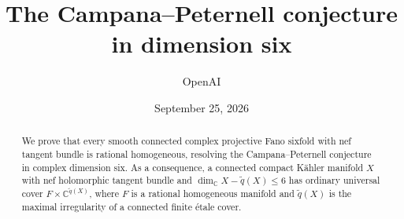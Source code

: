 \documentclass[11pt]{article}
\title{The Campana--Peternell conjecture\protect\\ in dimension six}
\author{OpenAI}
\date{September 25, 2026}
\theoremstyle{definition}
\theoremstyle{remark}
\numberwithin{equation}{section}
\begin{document}
\maketitle
\begin{abstract}
We prove that every smooth connected complex projective Fano sixfold with nef
tangent bundle is rational homogeneous, resolving the Campana--Peternell
conjecture in complex dimension six.
As a consequence, a connected compact K\"ahler manifold $X$ with nef
holomorphic tangent bundle and
$\dim_{\mathbb C}X-\widetilde q(X)\leq6$ has ordinary universal cover
$F\times\mathbb C^{\widetilde q(X)}$, where $F$ is a rational homogeneous
manifold and $\widetilde q(X)$ is the maximal irregularity of a connected
finite \'{e}tale cover.
\end{abstract}
\tableofcontents
\clearpage








\appendix

\begingroup
\small


\endgroup
\end{document}

